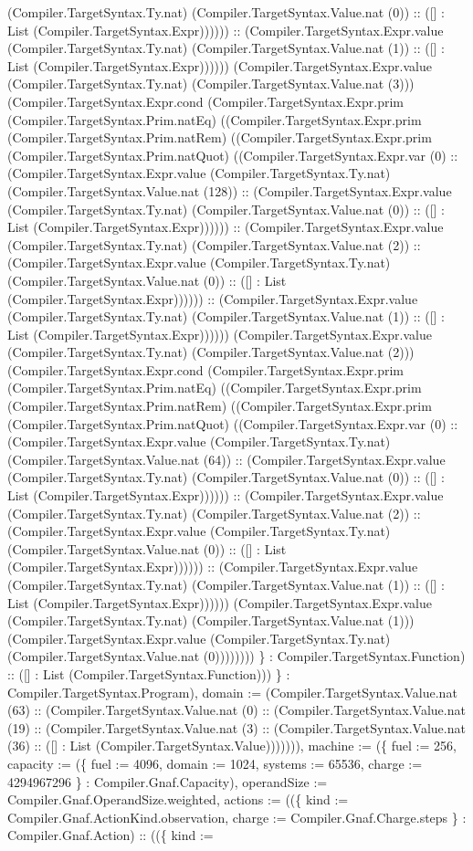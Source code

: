 \documentclass[11pt]{article}
\begin{document}
(Compiler.TargetSyntax.Ty.nat) (Compiler.TargetSyntax.Value.nat (0)) :: ([] : List (Compiler.TargetSyntax.Expr)))))) :: (Compiler.TargetSyntax.Expr.value (Compiler.TargetSyntax.Ty.nat) (Compiler.TargetSyntax.Value.nat (1)) :: ([] : List (Compiler.TargetSyntax.Expr)))))) (Compiler.TargetSyntax.Expr.value (Compiler.TargetSyntax.Ty.nat) (Compiler.TargetSyntax.Value.nat (3))) (Compiler.TargetSyntax.Expr.cond (Compiler.TargetSyntax.Expr.prim (Compiler.TargetSyntax.Prim.natEq) ((Compiler.TargetSyntax.Expr.prim (Compiler.TargetSyntax.Prim.natRem) ((Compiler.TargetSyntax.Expr.prim (Compiler.TargetSyntax.Prim.natQuot) ((Compiler.TargetSyntax.Expr.var (0) :: (Compiler.TargetSyntax.Expr.value (Compiler.TargetSyntax.Ty.nat) (Compiler.TargetSyntax.Value.nat (128)) :: (Compiler.TargetSyntax.Expr.value (Compiler.TargetSyntax.Ty.nat) (Compiler.TargetSyntax.Value.nat (0)) :: ([] : List (Compiler.TargetSyntax.Expr)))))) :: (Compiler.TargetSyntax.Expr.value (Compiler.TargetSyntax.Ty.nat) (Compiler.TargetSyntax.Value.nat (2)) :: (Compiler.TargetSyntax.Expr.value (Compiler.TargetSyntax.Ty.nat) (Compiler.TargetSyntax.Value.nat (0)) :: ([] : List (Compiler.TargetSyntax.Expr)))))) :: (Compiler.TargetSyntax.Expr.value (Compiler.TargetSyntax.Ty.nat) (Compiler.TargetSyntax.Value.nat (1)) :: ([] : List (Compiler.TargetSyntax.Expr)))))) (Compiler.TargetSyntax.Expr.value (Compiler.TargetSyntax.Ty.nat) (Compiler.TargetSyntax.Value.nat (2))) (Compiler.TargetSyntax.Expr.cond (Compiler.TargetSyntax.Expr.prim (Compiler.TargetSyntax.Prim.natEq) ((Compiler.TargetSyntax.Expr.prim (Compiler.TargetSyntax.Prim.natRem) ((Compiler.TargetSyntax.Expr.prim (Compiler.TargetSyntax.Prim.natQuot) ((Compiler.TargetSyntax.Expr.var (0) :: (Compiler.TargetSyntax.Expr.value (Compiler.TargetSyntax.Ty.nat) (Compiler.TargetSyntax.Value.nat (64)) :: (Compiler.TargetSyntax.Expr.value (Compiler.TargetSyntax.Ty.nat) (Compiler.TargetSyntax.Value.nat (0)) :: ([] : List (Compiler.TargetSyntax.Expr)))))) :: (Compiler.TargetSyntax.Expr.value (Compiler.TargetSyntax.Ty.nat) (Compiler.TargetSyntax.Value.nat (2)) :: (Compiler.TargetSyntax.Expr.value (Compiler.TargetSyntax.Ty.nat) (Compiler.TargetSyntax.Value.nat (0)) :: ([] : List (Compiler.TargetSyntax.Expr)))))) :: (Compiler.TargetSyntax.Expr.value (Compiler.TargetSyntax.Ty.nat) (Compiler.TargetSyntax.Value.nat (1)) :: ([] : List (Compiler.TargetSyntax.Expr)))))) (Compiler.TargetSyntax.Expr.value (Compiler.TargetSyntax.Ty.nat) (Compiler.TargetSyntax.Value.nat (1))) (Compiler.TargetSyntax.Expr.value (Compiler.TargetSyntax.Ty.nat) (Compiler.TargetSyntax.Value.nat (0)))))))) \} : Compiler.TargetSyntax.Function) :: ([] : List (Compiler.TargetSyntax.Function))) \} : Compiler.TargetSyntax.Program), domain := (Compiler.TargetSyntax.Value.nat (63) :: (Compiler.TargetSyntax.Value.nat (0) :: (Compiler.TargetSyntax.Value.nat (19) :: (Compiler.TargetSyntax.Value.nat (3) :: (Compiler.TargetSyntax.Value.nat (36) :: ([] : List (Compiler.TargetSyntax.Value))))))), machine := (\{ fuel := 256, capacity := (\{ fuel := 4096, domain := 1024, systems := 65536, charge := 4294967296 \} : Compiler.Gnaf.Capacity), operandSize := Compiler.Gnaf.OperandSize.weighted, actions := ((\{ kind := Compiler.Gnaf.ActionKind.observation, charge := Compiler.Gnaf.Charge.steps \} : Compiler.Gnaf.Action) :: ((\{ kind := 
\end{document}
